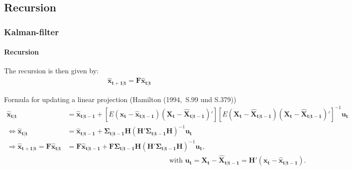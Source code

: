 \documentclass{beamer} %
\begin{document}
\subsection{Recursion}
\begin{frame}\frametitle{Kalman-filter}\framesubtitle{Recursion}
The recursion is then given by:
\begin{align*} \mathbf{\widehat{x}_{t+1|t}} = \mathbf{F} \mathbf{\widehat{x}_{t|t}} \end{align*}
\begin{block}{\scriptsize Formula for updating a linear projection (Hamilton (1994,~S.99 und S.379))}
\scriptsize\begin{align*}
  \mathbf{\widehat{x}_{t|t}} &= \mathbf{\widehat{x}_{t|t-1}}  +\left[E(\mathbf{x_t}-\mathbf{\widehat{x}_{t|t-1}})(\mathbf{X_t}-\mathbf{\widehat{X}_{t|t-1}})'\right] \left[E(\mathbf{X_t}-\mathbf{\widehat{X}_{t|t-1}})(\mathbf{X_t}-\mathbf{\widehat{X}_{t|t-1}})'\right]^{-1} \mathbf{u_t}\\
 \Leftrightarrow \mathbf{\widehat{x}_{t|t}}&= \mathbf{\widehat{x}_{t|t-1}}+ \boldsymbol{\Sigma_{t|t-1}} \mathbf{H} \left(\mathbf{H}'\boldsymbol{\Sigma_{t|t-1}}\mathbf{H}\right)^{-1} \mathbf{u_t}\\
  \Rightarrow \mathbf{\widehat{x}_{t+1|t}} = \mathbf{F} \mathbf{\widehat{x}_{t|t}} &=\mathbf{F} \mathbf{\widehat{x}_{t|t-1}}+ \mathbf{F}\boldsymbol{\Sigma_{t|t-1}} \mathbf{H} \left(\mathbf{H}'\boldsymbol{\Sigma_{t|t-1}}\mathbf{H}\right)^{-1} \mathbf{u_t}, \\
  &\qquad\qquad\qquad\qquad\qquad\qquad\qquad~~~ \text{with } \mathbf{u_t} = \mathbf{X_t} - \mathbf{\widehat{X}_{t|t-1}} = \mathbf{H'} (\mathbf{x_t} - \mathbf{\widehat{x}_{t|t-1}}).
\end{align*}
\end{block}
\end{frame}
\end{document}
